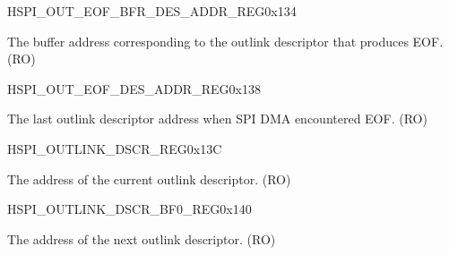 \begin{register}{H}{SPI\_OUT\_EOF\_BFR\_DES\_ADDR\_REG}{0x134}\label{regdesc:SPIOUTEOFBFRDESADDRREG}
%
\regnewline%
\begin{regdesc}\begin{reglist}
\item [SPI\_OUT\_EOF\_BFR\_DES\_ADDR\_REG]The buffer address corresponding to the outlink descriptor that produces EOF. (RO)
\end{reglist}\end{regdesc}
\end{register}


\begin{register}{H}{SPI\_OUT\_EOF\_DES\_ADDR\_REG}{0x138}\label{regdesc:SPIOUTEOFDESADDRREG}
%
\regnewline%
\begin{regdesc}\begin{reglist}
\item [SPI\_OUT\_EOF\_DES\_ADDR\_REG]The last outlink descriptor address when SPI DMA encountered EOF. (RO)
\end{reglist}\end{regdesc}
\end{register}


\begin{register}{H}{SPI\_OUTLINK\_DSCR\_REG}{0x13C}\label{regdesc:SPIOUTLINKDSCRREG}
%
\regnewline%
\begin{regdesc}\begin{reglist}
\item [SPI\_OUTLINK\_DSCR\_REG]The address of the current outlink descriptor. (RO)
\end{reglist}\end{regdesc}
\end{register}


\begin{register}{H}{SPI\_OUTLINK\_DSCR\_BF0\_REG}{0x140}\label{regdesc:SPIOUTLINKDSCRBF0REG}
%
\regnewline%
\begin{regdesc}\begin{reglist}
\item [SPI\_OUTLINK\_DSCR\_BF0\_REG]The address of the next outlink descriptor. (RO)
\end{reglist}\end{regdesc}
\end{register}


